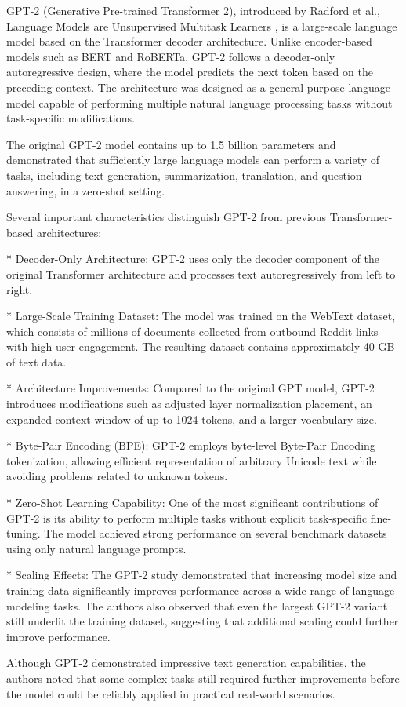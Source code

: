 \begin{markdown}

GPT-2 (Generative Pre-trained Transformer 2), introduced by Radford et al., Language Models are Unsupervised Multitask Learners \cite{radford_language_2019}, is a large-scale language model based on the Transformer decoder architecture. Unlike encoder-based models such as BERT and RoBERTa, GPT-2 follows a decoder-only autoregressive design, where the model predicts the next token based on the preceding context. The architecture was designed as a general-purpose language model capable of performing multiple natural language processing tasks without task-specific modifications.

The original GPT-2 model contains up to 1.5 billion parameters and demonstrated that sufficiently large language models can perform a variety of tasks, including text generation, summarization, translation, and question answering, in a zero-shot setting.

Several important characteristics distinguish GPT-2 from previous Transformer-based architectures:

* Decoder-Only Architecture: GPT-2 uses only the decoder component of the original Transformer architecture and processes text autoregressively from left to right.

* Large-Scale Training Dataset: The model was trained on the WebText dataset, which consists of millions of documents collected from outbound Reddit links with high user engagement. The resulting dataset contains approximately 40 GB of text data.

* Architecture Improvements: Compared to the original GPT model, GPT-2 introduces modifications such as adjusted layer normalization placement, an expanded context window of up to 1024 tokens, and a larger vocabulary size.

* Byte-Pair Encoding (BPE): GPT-2 employs byte-level Byte-Pair Encoding tokenization, allowing efficient representation of arbitrary Unicode text while avoiding problems related to unknown tokens.

* Zero-Shot Learning Capability: One of the most significant contributions of GPT-2 is its ability to perform multiple tasks without explicit task-specific fine-tuning. The model achieved strong performance on several benchmark datasets using only natural language prompts.

* Scaling Effects: The GPT-2 study demonstrated that increasing model size and training data significantly improves performance across a wide range of language modeling tasks. The authors also observed that even the largest GPT-2 variant still underfit the training dataset, suggesting that additional scaling could further improve performance.

Although GPT-2 demonstrated impressive text generation capabilities, the authors noted that some complex tasks still required further improvements before the model could be reliably applied in practical real-world scenarios.

\end{markdown}

